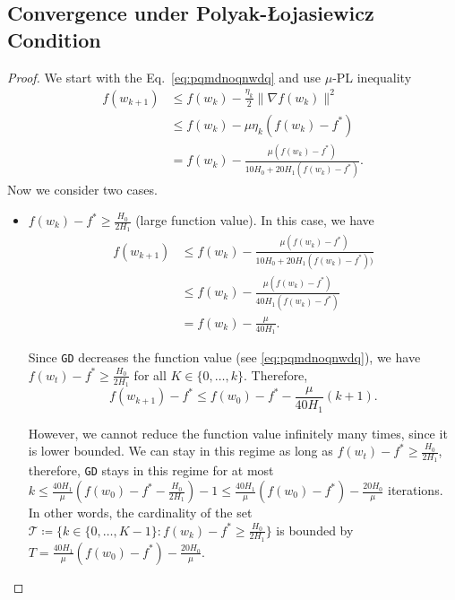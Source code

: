 \documentclass[a4paper,11pt]{article}
\newcommand{\algname}[1]{\texttt{#1}}
\newcommand{\cT}{\mathcal T}
\newcommand{\1}{\mathbbm{1}}
\newcommand{\eqdef}{\coloneqq}
\theoremstyle{plain}
\begin{document}
\subsection{Convergence under Polyak-{\L}ojasiewicz Condition}

\theorempleterministic*

\begin{proof}
    We start with the Eq.~\eqref{eq:pqmdnoqnwdq} and use $\mu$-PL inequality
    \begin{align*}
        f(w_{k+1}) &\le f(w_k) - \frac{\eta_k}{2}\|\nabla f(w_k)\|^2\\
        &\le f(w_k) - \mu\eta_k(f(w_k)-f^*)\\
        &= f(w_k) - \frac{\mu(f(w_k)-f^*)}{10H_0 + 20H_1(f(w_k)-f^*)}.
    \end{align*}
    Now we consider two cases.
    \begin{itemize}
        \item $f(w_k) - f^* \ge \frac{H_0}{2H_1}$ (large function value). In this case, we have
        \begin{align*}
            f(w_{k+1}) &\le f(w_k) - \frac{\mu(f(w_k)-f^*)}{10H_0+20H_1(f(w_k)-f^*))}\\
            &\le f(w_k) - \frac{\mu(f(w_k)-f^*)}{40H_1(f(w_k)-f^*)}\\
            &= f(w_k) - \frac{\mu}{40H_1}.
        \end{align*}
        
         Since \algname{GD} decreases the function value (see \eqref{eq:pqmdnoqnwdq}), we have $f(w_t) - f^* \ge \frac{H_0}{2H_1}$ for all $K\in\{0,\dots,k\}.$ Therefore, 
        \[
        f(w_{k+1}) - f^*\le f(w_0)-f^* - \frac{\mu}{40H_1}(k+1).
        \]
        
        However, we cannot reduce the function value infinitely many times, since it is lower bounded. We can stay in this regime as long as $f(w_t)-f^*\ge \frac{H_0}{2H_1}$, therefore, \algname{GD} stays in this regime for at most $k\le \frac{40H_1}{\mu}\left(f(w_0)-f^* -\frac{H_0}{2H_1}\right) -1 \le \frac{40H_1}{\mu}(f(w_0)-f^*) - \frac{20H_0}{\mu}$ iterations. In other words, the cardinality of the set $\cT\eqdef\{k\in\{0,\dots, K-1\}\colon f(w_k) - f^* \ge \frac{H_0}{2H_1}\}$ is bounded by $T = \frac{40H_1}{\mu}(f(w_0)-f^*) - \frac{20H_0}{\mu}.$


\end{itemize}
\end{proof}
\end{document}
